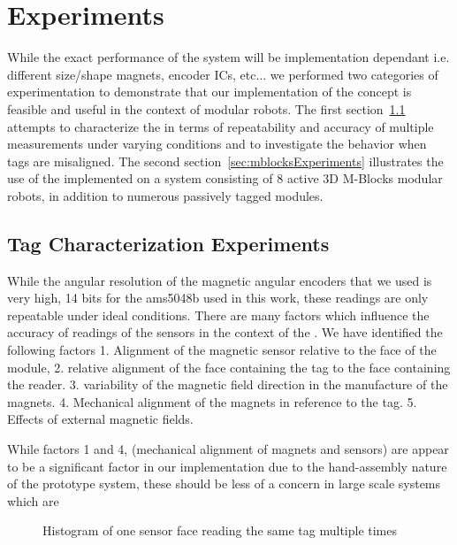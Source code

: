 \section{Experiments}
\label{sec:Experiments}
While the exact performance of the \tagName system will be implementation dependant i.e. different size/shape magnets, encoder ICs, etc... we performed two categories of experimentation to demonstrate that our implementation of the \tagName concept is feasible and useful in the context of modular robots. The first section~\ref{sec:characterize} attempts to characterize the \tagNamePlural in terms of repeatability and accuracy of multiple measurements under varying conditions and to investigate the behavior when tags are misaligned. The second section~\ref{sec:mblocksExperiments} illustrates the use of the \tagNamePlural implemented on a system consisting of 8 active 3D M-Blocks modular robots, in addition to numerous passively tagged modules.

\subsection{Tag Characterization Experiments}
\label{sec:characterize}

While the angular resolution of the magnetic angular encoders that we used is very high, 14 bits for the ams5048b used in this work, these readings are only repeatable under ideal conditions. There are many factors which influence the accuracy of readings of the sensors in the context of the \tagNamePlural. We have identified the following factors 1. Alignment of the magnetic sensor relative to the face of the module, 2. relative alignment of the face containing the tag to the face containing the reader. 3. variability of the magnetic field direction in the manufacture of the magnets. 4. Mechanical alignment of the magnets in reference to the tag. 5. Effects of external magnetic fields.

While factors 1 and 4, (mechanical alignment of magnets and sensors) are appear to be a significant factor in our implementation due to the hand-assembly nature of the prototype system, these should be less of a concern in large scale systems which are 
	
\begin{figure}[h]
	
	\caption{Histogram of one sensor face reading the same tag multiple times}
	\label{fig:histogram}
\end{figure}

